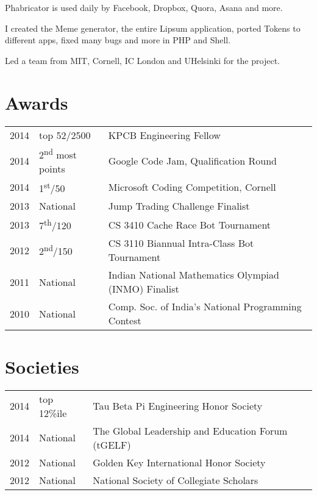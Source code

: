 \documentclass[]{deedy-resume-openfont}
\begin{document}
\begin{minipage}[t]{0.66\textwidth}
\begin{tightemize}
\item Phabricator is used daily by Facebook, Dropbox, Quora, Asana and more.\item I created the Meme generator, the entire Lipsum application, ported Tokens to different apps, fixed many bugs and more in PHP and Shell.\item Led a team from MIT, Cornell, IC London and UHelsinki for the project.\end{tightemize}
\sectionsep



\section{Awards} 
\begin{tabular}{rll}
2014	     & top 52/2500  & KPCB Engineering Fellow\\
2014	     & 2\textsuperscript{nd} most points  & Google Code Jam, Qualification Round\\
2014	     & 1\textsuperscript{st}/50  & Microsoft Coding Competition, Cornell\\
2013	     & National  & Jump Trading Challenge Finalist\\
2013     & 7\textsuperscript{th}/120 & CS 3410 Cache Race Bot Tournament  \\
2012     & 2\textsuperscript{nd}/150 & CS 3110 Biannual Intra-Class Bot Tournament \\
2011     & National & Indian National Mathematics Olympiad (INMO) Finalist \\
2010     & National & Comp. Soc. of India's National Programming Contest\\
\end{tabular}
\sectionsep


\section{Societies} 

\begin{tabular}{rll}
2014 	& top 12\%ile    & Tau Beta Pi Engineering Honor Society\\
2014   & National   & The Global Leadership and Education Forum (tGELF)\\
2012   &  National  & Golden Key International Honor Society\\
2012   &  National   & National Society of Collegiate Scholars\\
\end{tabular}
\sectionsep

\end{minipage} 
\end{document}
